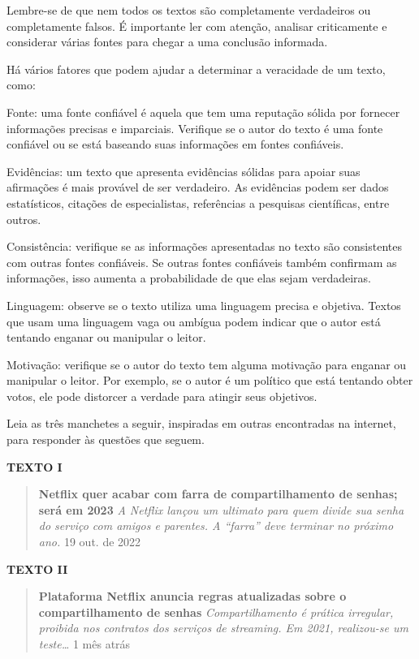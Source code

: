 {Lembre-se de que nem todos os textos são completamente verdadeiros ou
completamente falsos. É importante ler com atenção, analisar
criticamente e considerar várias fontes para chegar a uma conclusão
informada.

Há vários fatores que podem ajudar a determinar a veracidade de um
texto, como:

Fonte: uma fonte confiável é aquela que tem uma reputação
sólida por fornecer informações precisas e imparciais. Verifique se o
autor do texto é uma fonte confiável ou se está baseando suas
informações em fontes confiáveis.

Evidências: um texto que apresenta evidências sólidas para apoiar suas
afirmações é mais provável de ser verdadeiro. As evidências podem ser
dados estatísticos, citações de especialistas, referências a pesquisas
científicas, entre outros.

Consistência: verifique se as informações apresentadas no texto são
consistentes com outras fontes confiáveis. Se outras fontes confiáveis
também confirmam as informações, isso aumenta a probabilidade de que
elas sejam verdadeiras.

Linguagem: observe se o texto utiliza uma linguagem precisa e objetiva.
Textos que usam uma linguagem vaga ou ambígua podem indicar que o autor
está tentando enganar ou manipular o leitor.

Motivação: verifique se o autor do texto tem alguma motivação para
enganar ou manipular o leitor. Por exemplo, se o autor é um político que
está tentando obter votos, ele pode distorcer a verdade para atingir
seus objetivos.}

Leia as três manchetes a seguir, inspiradas em outras encontradas na
internet, para responder às questões que seguem.

\textbf{TEXTO I}

\begin{quote}
\textbf{Netflix quer acabar com farra de compartilhamento de senhas;
será em 2023} \emph{A Netflix lançou um ultimato para quem divide sua
senha do serviço com amigos e parentes. A ``farra'' deve terminar no
próximo ano.} 19 out. de 2022
\end{quote}

\textbf{TEXTO II}

\begin{quote}
\textbf{Plataforma Netflix anuncia regras atualizadas sobre o
compartilhamento de senhas} \emph{Compartilhamento é prática irregular,
proibida nos contratos dos serviços de streaming. Em 2021, realizou-se
um teste\ldots{}} 1 mês atrás
\end{quote}

